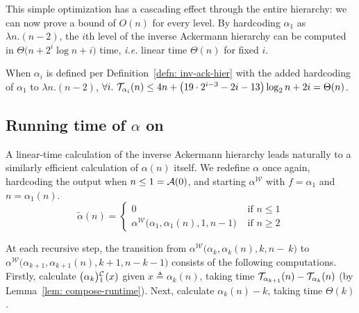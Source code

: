 This simple optimization has a cascading effect through the entire hierarchy:
we can now prove a bound of $O(n)$ for every level.
By hardcoding $\alpha_1$ as $\lambda n.(n-2)$, the $i$th level of the inverse Ackermann hierarchy can be computed in \linebreak $\Theta\big(n + 2^i\log n  + i\big)$ time, \emph{i.e.} linear time $\Theta(n)$ for fixed $i$.
\begin{thm} \label{thm: inv-ack-hier-runtime-improved}
	When $\alpha_i$ is defined per Definition~\ref{defn: inv-ack-hier} with the added hardcoding of $\alpha_1$ to $\lambda n. (n - 2)$, $\forall i.~\mathcal{T}_{\alpha_i}(n) \le 4n + \left(19\cdot 2^{i-3} - 2i - 13\right)\log_2n + 2i = \Theta(n)$.
\end{thm}

\subsection{Running time of $\alpha$ on } %

A linear-time calculation of the inverse Ackermann hierarchy 
leads naturally to a similarly efficient calculation of $\alpha(n)$ itself.
We redefine $\alpha$ once again, hardcoding the output 
when $n\le 1 = \mathcal{A}(0)$, and starting $\alpha^{\mathcal{W}}$ with 
$f = \alpha_1$ and $n = \alpha_1(n)$.
\begin{equation*}
\tilde{\alpha}(n) = \begin{cases}
0 & \text{ if } n \le 1 \\ \alpha^{\mathcal{W}}\big(\alpha_1, \alpha_1(n), 1, n-1\big) & \text{ if } n \ge 2
\end{cases}
\end{equation*}

At each recursive step, the transition from $\alpha^{\mathcal{W}}\big(\alpha_k, \alpha_k(n), k, n-~k\big)$ to $\alpha^{\mathcal{W}}\big(\alpha_{k+1}, \alpha_{k+1}(n), k+1, n-k-1\big)$ consists of the following computations. 
Firstly, calculate $\cdt{\big(\alpha_k\big)}{1}(x)$ given $x\triangleq \alpha_k(n)$, taking time $\mathcal{T}_{\alpha_{k+1}}(n) - \mathcal{T}_{\alpha_k}(n)$ (by Lemma~\ref{lem: compose-runtime}). Next, calculate $\alpha_k(n) - k$, taking time $\Theta(k)$.

